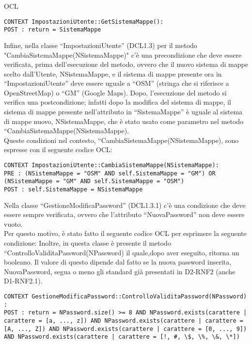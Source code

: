 \begin{listaPersonale}{OCL}
\begin{lstlisting}
CONTEXT ImpostazioniUtente::GetSistemaMappe():
POST : return = SistemaMappe 
    \end{lstlisting}
    Infine, nella classe “ImpostazioniUtente” (DCL1.3) per il metodo \\ "CambiaSistemaMappe(NSistemaMappe)" c'è una precondizione che deve essere verificata, prima dell'esecuzione del metodo, ovvero che il nuovo sistema di mappe scelto dall'Utente, NSistemaMappe, e il sistema di mappe presente ora in “ImpostazioniUtente” deve essere uguale a “OSM” (stringa che si riferisce a OpenStreetMap) o “GM” (Google Maps).
    Dopo, l'esecuzione del metodo si verifica una postcondizione; infatti dopo la modifica del sistema di mappe, il sistema di mappe presente nell'attributo in “SistemaMappe” è uguale al sistema di mappe nuovo, NSistemaMappe, che è stato usato come parametro nel metodo “CambiaSistemaMappe(NSistemaMappe).\\
    Queste condizioni nel contesto, “CambiaSistemaMappe(NSistemaMappe), sono espresse con il seguente codice OCL:

    \begin{lstlisting}
CONTEXT ImpostazioniUtente::CambiaSistemaMappe(NSistemaMappe):
PRE : (NSistemaMappe = "OSM" AND self.SistemaMappe = "GM") OR (NSistemaMappe = "GM" AND self.SistemaMappe = "OSM")
POST : self.SistemaMappe = NSistemaMappe
    \end{lstlisting}




    Nella classe “GestioneModificaPassword” (DCL1.3.1) c'è una condizione che deve essere sempre verificata, ovvero che l'attributo “NuovaPassword” non deve essere vuoto. \\
    Per questo motivo, è stato fatto il seguente codice OCL per esprimere la seguente condizione:
    Inoltre, in questa classe è presente il metodo “ControlloValiditaPassword(NPassword) il quale,dopo aver eseguito, ritorna un booleano. Il valore di questo dipende dal fatto se la nuova password inserita, NuovaPassword, segua o meno gli standard già presentati in D2-RNF2 (anche D1-RNF2.1).
    \begin{lstlisting}
CONTEXT GestioneModificaPassword::ControlloValiditaPassword(NPassword) :
POST : return = NPassword.size() >= 8 AND NPassword.exists(carattere | carattere = [a, ..., z]) AND NPassword.exists(carattere | carattere = [A, ..., Z]) AND NPassword.exists(carattere | carattere = [0, ..., 9]) AND NPassword.exists(carattere | carattere = [!, #, \$, \%, \&, \*])
    \end{lstlisting}


\end{listaPersonale}
